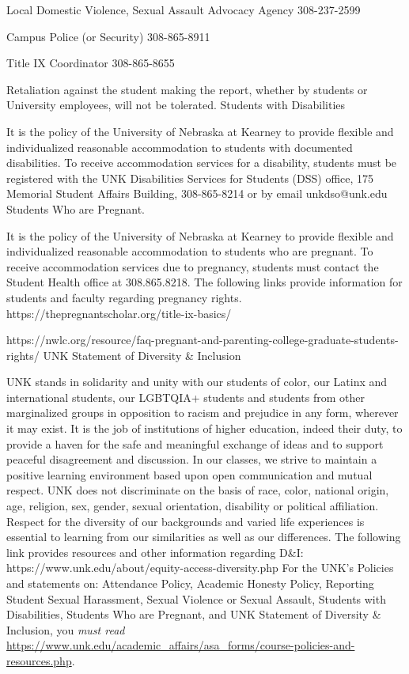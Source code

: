 \documentclass[12pt]{article}
\newcounter{ex}\setcounter{ex}{0}
\begin{document}
    Local Domestic Violence, Sexual Assault Advocacy Agency 308-237-2599

    Campus Police (or Security) 308-865-8911

    Title IX Coordinator 308-865-8655

Retaliation against the student making the report, whether by students or University employees, will not be tolerated.
Students with Disabilities

It is the policy of the University of Nebraska at Kearney to provide flexible and individualized reasonable accommodation to students with documented disabilities. To receive accommodation services for a disability, students must be registered with the UNK Disabilities Services for Students (DSS) office, 175 Memorial Student Affairs Building, 308-865-8214 or by email unkdso@unk.edu  
Students Who are Pregnant.

It is the policy of the University of Nebraska at Kearney to provide flexible and individualized reasonable accommodation to students who are pregnant. To receive accommodation services due to pregnancy, students must contact the Student Health office at 308.865.8218. The following links provide information for students and faculty regarding pregnancy rights. https://thepregnantscholar.org/title-ix-basics/

https://nwlc.org/resource/faq-pregnant-and-parenting-college-graduate-students-rights/
UNK Statement of Diversity & Inclusion

UNK stands in solidarity and unity with our students of color, our Latinx and international students, our LGBTQIA+ students and students from other marginalized groups in opposition to racism and prejudice in any form, wherever it may exist. It is the job of institutions of higher education, indeed their duty, to provide a haven for the safe and meaningful exchange of ideas and to support peaceful disagreement and discussion. In our classes, we strive to maintain a positive learning environment based upon open communication and mutual respect. UNK does not discriminate on the basis of race, color, national origin, age, religion, sex, gender, sexual orientation, disability or political affiliation. Respect for the diversity of our backgrounds and varied life experiences is essential to learning from our similarities as well as our differences. The following link provides resources and other information regarding D&I: https://www.unk.edu/about/equity-access-diversity.php
For the UNK's Policies and statements on: Attendance Policy, Academic Honesty Policy, 
Reporting Student Sexual Harassment, Sexual Violence or Sexual Assault, Students 
with Disabilities, Students Who are Pregnant, and UNK Statement of Diversity 
\& Inclusion,  you \emph{must read}
\url{https://www.unk.edu/academic_affairs/asa_forms/course-policies-and-resources.php}.
\end{document}
